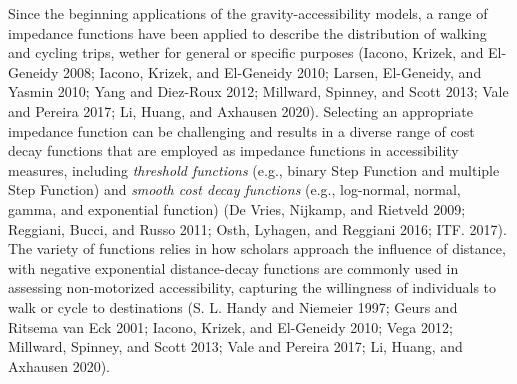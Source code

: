 \documentclass[preprint, 3p,
authoryear]{elsarticle} %
\begin{document}
Since the beginning applications of the gravity-accessibility models, a
range of impedance functions have been applied to describe the
distribution of walking and cycling trips, wether for general or
specific purposes (Iacono, Krizek, and El-Geneidy 2008; Iacono, Krizek,
and El-Geneidy 2010; Larsen, El-Geneidy, and Yasmin 2010; Yang and
Diez-Roux 2012; Millward, Spinney, and Scott 2013; Vale and Pereira
2017; Li, Huang, and Axhausen 2020). Selecting an appropriate impedance
function can be challenging and results in a diverse range of cost decay
functions that are employed as impedance functions in accessibility
measures, including \emph{threshold functions} (e.g., binary Step
Function and multiple Step Function) and \emph{smooth cost decay
functions} (e.g., log-normal, normal, gamma, and exponential function)
(De Vries, Nijkamp, and Rietveld 2009; Reggiani, Bucci, and Russo 2011;
Osth, Lyhagen, and Reggiani 2016; ITF. 2017). The variety of functions
relies in how scholars approach the influence of distance, with negative
exponential distance-decay functions are commonly used in assessing
non-motorized accessibility, capturing the willingness of individuals to
walk or cycle to destinations (S. L. Handy and Niemeier 1997; Geurs and
Ritsema van Eck 2001; Iacono, Krizek, and El-Geneidy 2010; Vega 2012;
Millward, Spinney, and Scott 2013; Vale and Pereira 2017; Li, Huang, and
Axhausen 2020).
\end{document}
